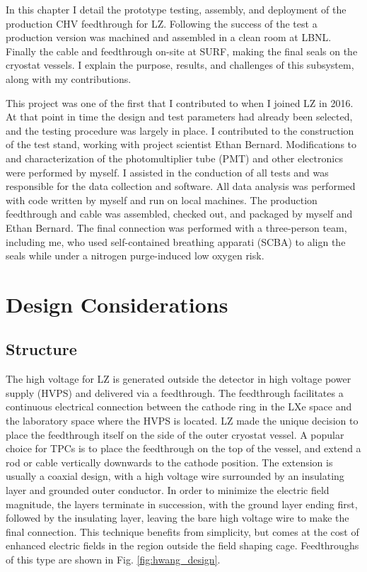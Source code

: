 In this chapter I detail the prototype testing, assembly, and deployment of the production CHV feedthrough for LZ.
Following the success of the test a production version was machined and assembled in a clean room at LBNL.
Finally the cable and feedthrough on-site at SURF, making the final seals on the cryostat vessels.
I explain the purpose, results, and challenges of this subsystem, along with my contributions.

This project was one of the first that I contributed to when I joined LZ in 2016.
At that point in time the  design and test parameters had already been selected, and the testing procedure was largely in place.
I contributed to the construction of the test stand, working with project scientist Ethan Bernard.
Modifications to and characterization of the photomultiplier tube (PMT) and other electronics were performed by myself.
I assisted in the conduction of all tests and was responsible for the data collection and software.
All data analysis was performed with code written by myself and run on local machines.
The production feedthrough and cable was assembled, checked out, and packaged by myself and Ethan Bernard.
The final connection was performed with a three-person team, including me, who used self-contained breathing apparati (SCBA) to align the seals while under a nitrogen purge-induced low oxygen risk.

\section {Design Considerations}
\label{sec:design}
\subsection{Structure}
The high voltage for LZ is generated outside the detector in high voltage power supply (HVPS) and delivered via a feedthrough.
The feedthrough facilitates a continuous electrical connection between the cathode ring in the LXe space and the laboratory space where the HVPS is located.
LZ made the unique decision to place the feedthrough itself on the side of the outer cryostat vessel.
A popular choice for TPCs is to place the feedthrough on the top of the vessel, and extend a rod or cable vertically downwards to the cathode position. 
The extension is usually a coaxial design, with a high voltage wire surrounded by an insulating layer and grounded outer conductor.
In order to minimize the electric field magnitude, the layers terminate in succession, with the ground layer ending first, followed by the insulating layer, leaving the bare high voltage wire to make the final connection.
This technique benefits from simplicity, but comes at the cost of enhanced electric fields in the region outside the field shaping cage.
Feedthroughs of this type are shown in Fig. \ref{fig:hwang_design}.


